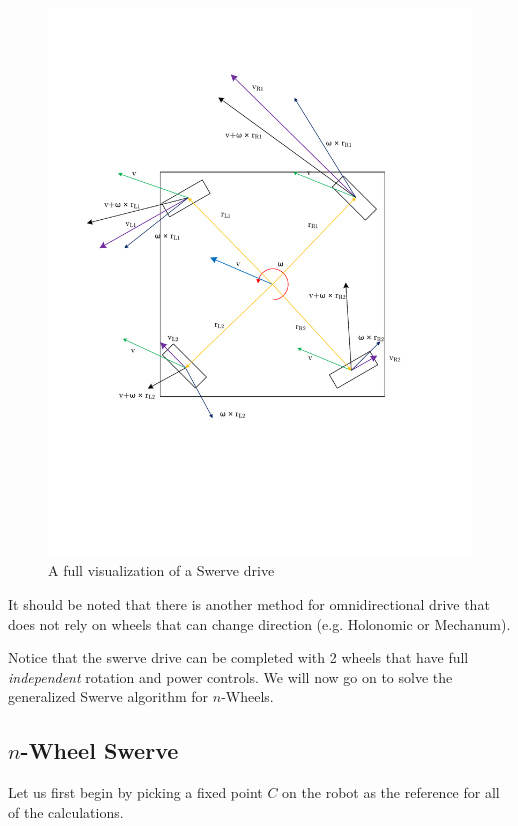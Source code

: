 \documentclass[a4paper]{article}
\begin{document}
\begin{figure}[h]%
\begin{center}
\includegraphics[scale=0.7]{Diagrams/SwerveMathExtensive.pdf}
\end{center}
\caption{A full visualization of a Swerve drive}%
\label{SwerveMathExtensive}%
\end{figure}

It should be noted that there is another method for omnidirectional drive that does not rely on wheels that can change direction (e.g. Holonomic or Mechanum).

Notice that the swerve drive can be completed with 2 wheels that have full \textit{independent} rotation and power controls. We will now go on to solve the generalized Swerve algorithm for $n$-Wheels. 
\newpage

\subsection{$n$-Wheel Swerve}
Let us first begin by picking a fixed point $C$ on the robot as the reference for all of the calculations. 
\end{document}
